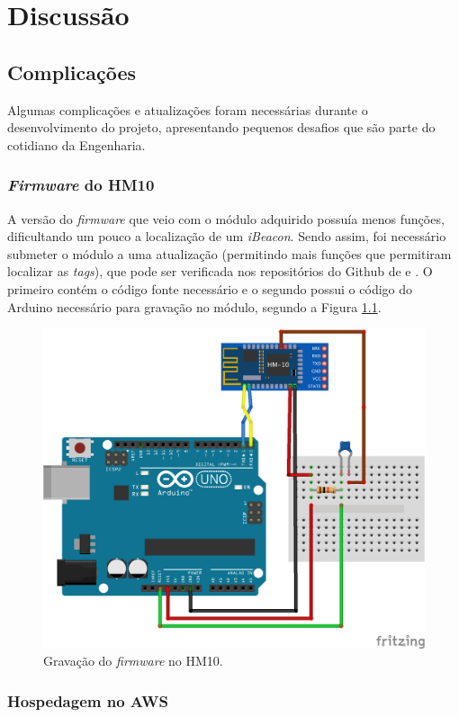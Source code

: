 \documentclass[
	12pt,				%
	openright,			%
	twoside,			%
	a4paper,			%
	english,			%
	french,				%
	spanish,			%
	brazil				%
	]{abntex2}
\begin{document}
\part{Discussão}

\chapter{Complicações}

Algumas complicações e atualizações foram necessárias durante o desenvolvimento do projeto, apresentando pequenos desafios que são parte do cotidiano da Engenharia. 

\section{\textit{Firmware} do HM10}

A versão do \textit{firmware} que veio com o módulo adquirido possuía menos funções, dificultando um pouco a localização de um \textit{iBeacon}. Sendo assim, foi necessário submeter o módulo a uma atualização (permitindo mais funções que permitiram localizar as \textit{tags}), que pode ser verificada nos repositórios do Github de  e . O primeiro contém o código fonte necessário e o segundo possui o código do Arduino necessário para gravação no módulo, segundo a Figura \ref{fig:firmware}.

\begin{figure}[h!]
    \centering
    \includegraphics[width=0.6\linewidth]{firmware}
    \caption{Gravação do \textit{firmware} no HM10.}
    \label{fig:firmware}
\end{figure}

\section{Hospedagem no AWS}
\end{document}
